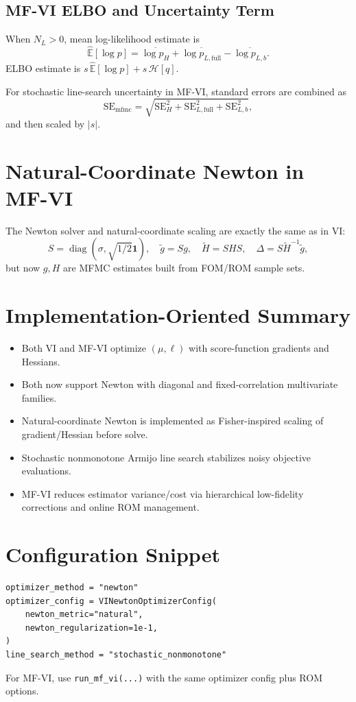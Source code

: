 \documentclass[11pt]{article}
\begin{document}
\subsection{MF-VI ELBO and Uncertainty Term}
When \(N_L>0\), mean log-likelihood estimate is
\begin{equation}
\widehat{\mathbb{E}}[\log p]
= \overline{\log p_H}
 + \overline{\log p_{L,\mathrm{full}}}
 - \overline{\log p_{L,b}}.
\end{equation}
ELBO estimate is \(s\,\widehat{\mathbb{E}}[\log p] + s\,\mathcal{H}[q]\).

For stochastic line-search uncertainty in MF-VI, standard errors are combined as
\begin{equation}
\mathrm{SE}_{\mathrm{mfmc}}
= \sqrt{\mathrm{SE}_H^2 + \mathrm{SE}_{L,\mathrm{full}}^2 + \mathrm{SE}_{L,b}^2},
\end{equation}
and then scaled by \(|s|\).

\section{Natural-Coordinate Newton in MF-VI}
The Newton solver and natural-coordinate scaling are exactly the same as in VI:
\begin{equation}
S=\operatorname{diag}(\sigma,\sqrt{1/2}\mathbf{1}),\quad
\tilde g= Sg,\quad \tilde H=SHS,\quad \Delta=S\tilde H^{-1}\tilde g,
\end{equation}
but now \(g,H\) are MFMC estimates built from FOM/ROM sample sets.

\section{Implementation-Oriented Summary}
\begin{itemize}
  \item Both VI and MF-VI optimize \((\mu,\ell)\) with score-function gradients and Hessians.
  \item Both now support Newton with diagonal and fixed-correlation multivariate families.
  \item Natural-coordinate Newton is implemented as Fisher-inspired scaling of gradient/Hessian before solve.
  \item Stochastic nonmonotone Armijo line search stabilizes noisy objective evaluations.
  \item MF-VI reduces estimator variance/cost via hierarchical low-fidelity corrections and online ROM management.
\end{itemize}

\section{Configuration Snippet}
\begin{verbatim}
optimizer_method = "newton"
optimizer_config = VINewtonOptimizerConfig(
    newton_metric="natural",
    newton_regularization=1e-1,
)
line_search_method = "stochastic_nonmonotone"
\end{verbatim}
For MF-VI, use \texttt{run\_mf\_vi(...)} with the same optimizer config plus ROM options.
\end{document}
